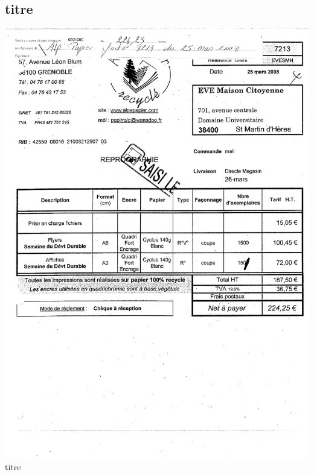 \subsection{titre}
\begin{center}
\includegraphics[scale=0.6]{annexes/images/facture_fournisseur_repro.pdf} \\
titre
\end{center}
